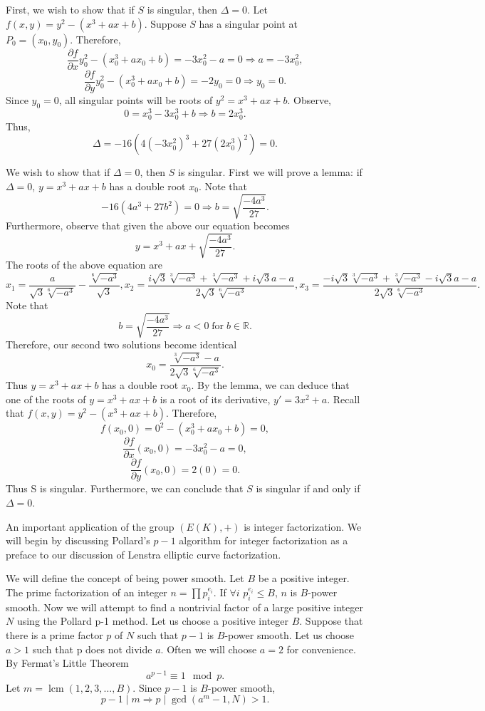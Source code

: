 \documentclass{article}
\DeclareMathOperator{\for}{for}
\DeclareMathOperator{\lcm}{lcm}
\begin{document}
\indent First, we wish to show that if $S$ is singular, then $\Delta=0$.
Let $f(x,y)=y^2-(x^3+ax+b)$. Suppose $S$ has a singular point at $P_0=(x_0, y_0)$. Therefore,
$$\frac{\partial f}{\partial x} y_0^2-(x_0^3+ax_0+b)=-3x_0^2-a=0 \Longrightarrow a=-3x_0^2,$$
$$\frac{\partial f}{\partial y} y_0^2-(x_0^3+ax_0+b)=-2y_0=0 \Longrightarrow y_0=0.$$
Since $y_0=0$, all singular points will be roots of $y^2=x^3+ax+b$. Observe,
$$0=x_0^3-3x_0^3+b \Longrightarrow b=2x_0^3.$$
Thus,
$$\Delta=-16(4(-3x_0^2)^3+27(2x_0^3)^2)=0.$$

\indent We wish to show that if $\Delta=0$, then $S$ is singular. First we will prove a lemma: if $\Delta=0$, $y=x^3+ax+b$ has a double root $x_0$. Note that
$$-16(4a^3+27b^2)=0 \Longrightarrow b = \sqrt{\frac{-4a^3}{27}}.$$
Furthermore, observe that given the above our equation becomes
$$y=x^3+ax+\sqrt{\frac{-4a^3}{27}}.$$
The roots of the above equation are
$$x_1=\frac{a}{\sqrt{3}\sqrt[6]{-a^3}}-\frac{\sqrt[6]{-a^3}}{\sqrt{3}}, x_2=\frac{i\sqrt{3}\sqrt[3]{-a^3}+\sqrt[3]{-a^3}+i\sqrt{3}a-a}{2\sqrt{3}\sqrt[6]{-a^3}}, x_3=\frac{-i\sqrt{3}\sqrt[3]{-a^3}+\sqrt[3]{-a^3}-i\sqrt{3}a-a}{2\sqrt{3}\sqrt[6]{-a^3}}.$$
Note that
$$b=\sqrt{\frac{-4a^3}{27}} \Longrightarrow a<0 \for b \in \mathbb{R}.$$
Therefore, our second two solutions become identical
$$x_0=\frac{\sqrt[3]{-a^3}-a}{2\sqrt{3}\sqrt[6]{-a^3}}.$$
Thus $y=x^3+ax+b$ has a double root $x_0$.
By the lemma, we can deduce that one of the roots of $y=x^3+ax+b$ is a root of its derivative, $y'=3x^2+a$. Recall that $f(x,y)=y^2-(x^3+ax+b)$. Therefore,
$$f(x_0,0)=0^2-(x_0^3+ax_0+b)=0,$$
$$\frac{\partial f}{\partial x} (x_0,0)=-3x_0^2-a=0,$$
$$\frac{\partial f}{\partial y} (x_0,0)=2(0)=0.$$
Thus S is singular. Furthermore, we can conclude that $S$ is singular if and only if $\Delta=0$. 

\indent An important application of the group $(E(K),+)$ is integer factorization. We will begin by discussing Pollard's $p-1$ algorithm for integer factorization as a preface to our discussion of Lenstra elliptic curve factorization.

\indent We will define the concept of being power smooth. Let $B$ be a positive integer. The prime factorization of an integer $n=\prod p_{i}^{e_{i}}$. If $\forall i$ $p_{i}^{e_{i}} \leq B$, $n$ is $B$-power smooth. Now we will attempt to find a nontrivial factor of a large positive integer $N$ using the Pollard p-1 method. Let us choose a positive integer $B$. Suppose that there is a prime factor $p$ of $N$ such that $p-1$ is $B$-power smooth. Let us choose $a > 1$ such that p does not divide $a$. Often we will choose $a=2$ for convenience. By Fermat's Little Theorem
$$a^{p-1} \equiv 1 \mod p.$$
Let $m = \lcm (1,2,3,\dotso,B)$. Since $p-1$ is $B$-power smooth, 
$$p-1 \mid m \Longrightarrow p \mid \gcd (a^m-1,N) > 1.$$
\end{document}
